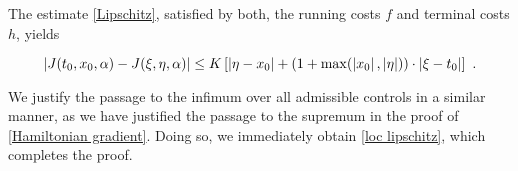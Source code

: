 The estimate \eqref{Lipschitz}, satisfied by both, the running costs $ f $ and terminal costs $ h $, yields

\begin{equation*}
	\normof{J(t_0, x_0, \alpha) - J(\xi, \eta, \alpha)} \leq K \left[\normof{\eta - x_0} + (1 + \max(\normof{x_0}, \normof{\eta})) \cdot \normof{\xi - t_0} \right] \ .
\end{equation*}

We justify the passage to the infimum over all admissible controls in a similar manner, as we have justified the passage to the supremum in the proof of \ref{Hamiltonian gradient}. Doing so, we immediately obtain \eqref{loc lipschitz}, which completes the proof.
